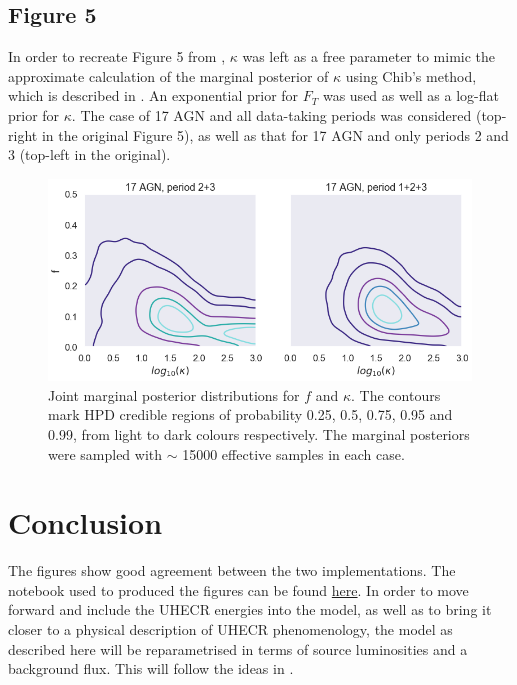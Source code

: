 \documentclass[fontsize=12pt]{article}
\begin{document}
\subsection{Figure 5}

In order to recreate Figure 5 from \cite{soiaporn}, $\kappa$ was left as a free parameter to mimic the approximate calculation of the marginal posterior of $\kappa$ using Chib's method, which is described in \cite{soiaporn}. An exponential prior for $F_T$ was used as well as a log-flat prior for $\kappa$. The case of 17 AGN and all data-taking periods was considered (top-right in the original Figure 5), as well as that for 17 AGN and only periods 2 and 3 (top-left in the original). 

\begin{figure}[h]
\centering
\includegraphics[width = \textwidth]{figures/soiaporn_fig5.png}
\caption{Joint marginal posterior distributions for $f$ and $\kappa$. The contours mark HPD credible regions of probability 0.25, 0.5, 0.75, 0.95 and 0.99, from light to dark colours respectively. The marginal posteriors were sampled with $\sim$ 15000 effective samples in each case.}
\end{figure}

\section{Conclusion}

The figures show good agreement between the two implementations. The notebook used to produced the figures can be found \href{https://github.com/cescalara/uhecr_model/blob/master/notebooks/auger2010_study.ipynb}{here}. In order to move forward and include the UHECR energies into the model, as well as to bring it closer to a physical description of UHECR phenomenology, the model as described here will be reparametrised in terms of source luminosities and a background flux. This will follow the ideas in \cite{watson, khanin}.
\end{document}
